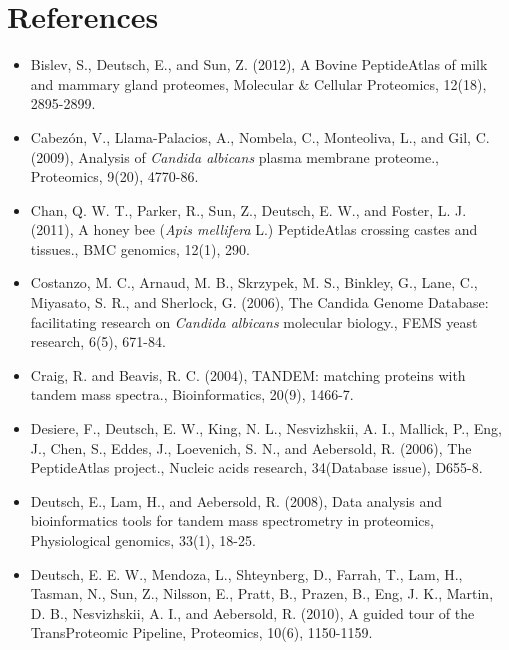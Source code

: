 \section*{References}


\begin{itemize}[leftmargin=*]

\item[]{
Bislev, S., Deutsch, E., and Sun, Z. (2012), A Bovine PeptideAtlas of milk and mammary gland
proteomes, Molecular \& Cellular Proteomics, 12(18), 2895-2899.
}

\item[]{
Cabez\'on, V., Llama-Palacios, A., Nombela, C., Monteoliva, L., and Gil, C. (2009), Analysis of
\textit{Candida albicans} plasma membrane proteome., Proteomics, 9(20), 4770-86.
}

\item[]{
Chan, Q. W. T., Parker, R., Sun, Z., Deutsch, E. W., and Foster, L. J. (2011), A honey bee
(\textit{Apis mellifera} L.) PeptideAtlas crossing castes and tissues., BMC genomics, 12(1), 290.
}

\item[]{
Costanzo, M. C., Arnaud, M. B., Skrzypek, M. S., Binkley, G., Lane, C., Miyasato, S. R., and
Sherlock, G. (2006), The Candida Genome Database: facilitating research on 
\textit{Candida albicans} molecular biology., FEMS yeast research, 6(5), 671-84.
}

\item[]{
Craig, R. and Beavis, R. C. (2004), TANDEM: matching proteins with tandem mass spectra.,
Bioinformatics, 20(9), 1466-7.
}

\item[]{
Desiere, F., Deutsch, E. W., King, N. L., Nesvizhskii, A. I., Mallick, P., Eng, J., Chen, S., Eddes,
J., Loevenich, S. N., and Aebersold, R. (2006), The PeptideAtlas project., Nucleic acids
research, 34(Database issue), D655-8.
}

\item[]{
Deutsch, E., Lam, H., and Aebersold, R. (2008), Data analysis and bioinformatics tools for
tandem mass spectrometry in proteomics, Physiological genomics, 33(1), 18-25.
}

\item[]{
Deutsch, E. E. W., Mendoza, L., Shteynberg, D., Farrah, T., Lam, H., Tasman, N., Sun, Z.,
Nilsson, E., Pratt, B., Prazen, B., Eng, J. K., Martin, D. B., Nesvizhskii, A. I., and Aebersold,
R. (2010), A guided tour of the TransProteomic Pipeline, Proteomics, 10(6), 1150-1159.
}


\end{itemize}
